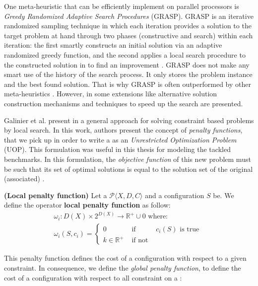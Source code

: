 One meta-heuristic that can be efficiently implement on parallel processors is {\it Greedy Randomized Adaptive Search Procedures} (GRASP). GRASP is an iterative randomized sampling technique in which each iteration provides a solution to the target problem at hand through two phases (constructive and search) within each iteration: the first smartly constructs an initial solution via an adaptive randomized greedy function, and the second applies a local search procedure to the constructed solution in to find an improvement \cite{Feo95}. GRASP does not make any smart use of the history of the search process. It only stores the problem instance and the best found solution. That is why GRASP is often outperformed by other meta-heuristics \cite{Blum2003}. However, in \cite{Resende2009} some extensions like alternative solution construction mechanisms and techniques to speed up the search are presented.

Galinier et al. present in \cite{Galinier04} a general approach for solving constraint based problems by local search. In this work, authors present the concept of {\it penalty functions}, that we pick up in order to write a \csp{} as an \textit{Unrestricted Optimization Problem} (UOP). This formulation was useful in this thesis for modeling the tackled benchmarks. In this formulation, the \textit{objective function} of this new problem must be such that its set of optimal solutions is equal to the solution set of the original (associated) \csp.

\begin{definition}{\bf (Local penalty function)}
\label{def:local_cost}
Let a {\bf \csp} $\mathcal{P}\langle X,D,C \rangle$ and a configuration $S$ be. We define the operator {\bf local penalty function} as follow: 
\begin{equation*}
\begin{array}{l}
	\omega_i:D\left(X\right)\times 2^{D\left(X\right)}\rightarrow\mathbb{R}^+\cup 0\text{ where: }\\
	\omega_i\left(S,c_i\right)=\left\{
	\begin{array}{lll}
	0 & \text{ if } & c_i(S)\text{ is true }\\
	k \in \mathbb{R}^+ & \text{ if not } &
	\end{array}
	\right.
\end{array}
\end{equation*}
\end{definition}

This penalty function defines the cost of a configuration with respect to a given constraint. In consequence, we define the \textit{global penalty function}, to define the cost of a configuration with respect to all constraint on a \csp:

